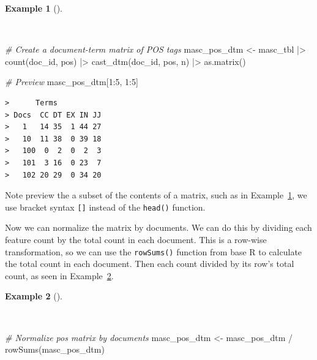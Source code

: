 \documentclass[
  letterpaper,
  DIV=11,
  numbers=noendperiod]{scrreprt}
\newenvironment{Shaded}{\begin{snugshade}}{\end{snugshade}}
\newcommand{\CommentTok}[1]{\textcolor[rgb]{0.00,0.00,0.00}{\textit{#1}}}
\newcommand{\DecValTok}[1]{\textcolor[rgb]{0.00,0.00,0.00}{#1}}
\newcommand{\FunctionTok}[1]{\textcolor[rgb]{0.00,0.00,0.00}{#1}}
\newcommand{\NormalTok}[1]{\textcolor[rgb]{0.00,0.00,0.00}{#1}}
\newcommand{\OtherTok}[1]{\textcolor[rgb]{0.00,0.00,0.00}{#1}}
\newcommand{\SpecialCharTok}[1]{\textcolor[rgb]{0.00,0.00,0.00}{#1}}
\theoremstyle{definition}
\newtheorem{example}{Example}[chapter]
\theoremstyle{remark}
\begin{document}
\begin{example}[]\protect\hypertarget{exm-eda-masc-dtms}{}\label{exm-eda-masc-dtms}

~

\begin{Shaded}
\begin{Highlighting}[]
\CommentTok{\# Create a document{-}term matrix of POS tags}
\NormalTok{masc\_pos\_dtm }\OtherTok{\textless{}{-}}
\NormalTok{  masc\_tbl }\SpecialCharTok{|\textgreater{}}
  \FunctionTok{count}\NormalTok{(doc\_id, pos) }\SpecialCharTok{|\textgreater{}}
  \FunctionTok{cast\_dtm}\NormalTok{(doc\_id, pos, n) }\SpecialCharTok{|\textgreater{}}
  \FunctionTok{as.matrix}\NormalTok{()}

\CommentTok{\# Preview}
\NormalTok{masc\_pos\_dtm[}\DecValTok{1}\SpecialCharTok{:}\DecValTok{5}\NormalTok{, }\DecValTok{1}\SpecialCharTok{:}\DecValTok{5}\NormalTok{]}
\end{Highlighting}
\end{Shaded}

\begin{verbatim}
>      Terms
> Docs  CC DT EX IN JJ
>   1   14 35  1 44 27
>   10  11 38  0 39 18
>   100  0  2  0  2  3
>   101  3 16  0 23  7
>   102 20 29  0 34 20
\end{verbatim}

\end{example}

Note preview the a subset of the contents of a matrix, such as in
Example~\ref{exm-eda-masc-dtms}, we use bracket syntax \texttt{{[}{]}}
instead of the \texttt{head()} function.

Now we can normalize the matrix by documents. We can do this by dividing
each feature count by the total count in each document. This is a
row-wise transformation, so we can use the \texttt{rowSums()} function
from base R to calculate the total count in each document. Then each
count divided by its row's total count, as seen in
Example~\ref{exm-eda-masc-dtms-normalized}.

\begin{example}[]\protect\hypertarget{exm-eda-masc-dtms-normalized}{}\label{exm-eda-masc-dtms-normalized}

~

\begin{Shaded}
\begin{Highlighting}[]
\CommentTok{\# Normalize pos matrix by documents}
\NormalTok{masc\_pos\_dtm }\OtherTok{\textless{}{-}}
\NormalTok{  masc\_pos\_dtm }\SpecialCharTok{/} \FunctionTok{rowSums}\NormalTok{(masc\_pos\_dtm)}
\end{Highlighting}
\end{Shaded}

\end{example}
\end{document}
